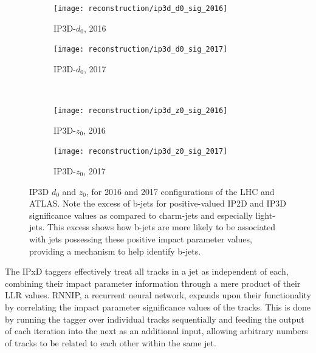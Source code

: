             \begin{figure}
                \begin{subfigure}{0.48\textwidth}
                    \texttt{[image: reconstruction/ip3d\_d0\_sig\_2016]}
                    \captionsetup{justification=centering} \caption{IP3D-$d_0$, 2016}
                \end{subfigure}
                \begin{subfigure}{0.48\textwidth}
                    \texttt{[image: reconstruction/ip3d\_d0\_sig\_2017]}
                    \captionsetup{justification=centering} \caption{IP3D-$d_0$, 2017}
                \end{subfigure} \\
                \begin{subfigure}{0.48\textwidth}
                    \texttt{[image: reconstruction/ip3d\_z0\_sig\_2016]}
                    \captionsetup{justification=centering} \caption{IP3D-$z_0$, 2016}
                \end{subfigure}
                \begin{subfigure}{0.48\textwidth}
                    \texttt{[image: reconstruction/ip3d\_z0\_sig\_2017]}
                    \captionsetup{justification=centering} \caption{IP3D-$z_0$, 2017}
                \end{subfigure}
                \caption{
                    IP3D $d_0$ and $z_0$, for 2016 and 2017 configurations of the LHC and ATLAS\cite{btagging_optimisation}.
                    Note the excess of b-jets for positive-valued IP2D and IP3D significance values as compared to charm-jets
                        and especially light-jets.
                    This excess shows how b-jets are more likely to be associated with jets possessing
                        these positive impact parameter values,
                        providing a mechanism to help identify b-jets.
                }
                \label{fig:ip3dsig}
            \end{figure}

            The IPxD taggers effectively treat all tracks in a jet as independent of each,
                combining their impact parameter information through a mere product of their LLR values.
            RNNIP, a recurrent neural network, expands upon their functionality by correlating
                the impact parameter significance values of the tracks.
            This is done by running the tagger over individual tracks sequentially
                and feeding the output of each iteration into the next as an additional input,
                allowing arbitrary numbers of tracks to be related to each other within the same jet.

